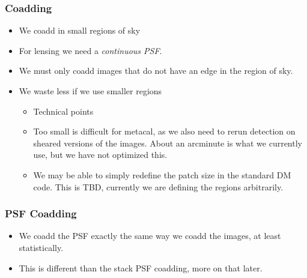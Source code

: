 \documentclass{beamer}
\begin{document}
\frame
{

    \frametitle{Coadding}


    \begin{itemize}

        \item We coadd in small regions of sky
        \item For lensing we need a {\em continuous PSF}.
        \item We must only coadd images that do not have an edge in the region of sky.
        \item We waste less if we use smaller regions

            \begin{itemize}

                \item Technical points

                \item Too small is difficult for metacal, as we also need to
                    rerun detection on sheared versions of the images. About an
                    arcminute is what we currently use, but we have not
                    optimized this.

                \item We may be able to simply redefine the patch size in the standard
                    DM code. This is TBD, currently we are defining the regions arbitrarily.

            \end{itemize}

    \end{itemize}

}

\frame
{

    \frametitle{PSF Coadding}

    \begin{itemize}

        \item We coadd the PSF exactly the same way we coadd the images, at
            least statistically.

        \item This is different than the stack PSF coadding, more on that later.

    \end{itemize}

}
\end{document}
